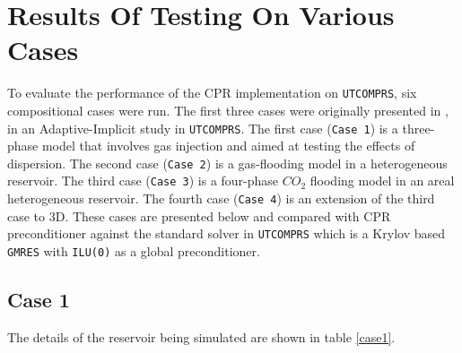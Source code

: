 \chapter{Results Of Testing On Various Cases}
To evaluate the performance of the CPR implementation on \texttt{UTCOMPRS}, six compositional cases were run. 
The first three cases were originally presented in \cite{fernandes}, in an Adaptive-Implicit study in \texttt{UTCOMPRS}. 
The first case (\texttt{Case 1}) is a three-phase model that involves gas injection and aimed 
at testing the effects of dispersion. The second case (\texttt{Case 2}) is a gas-flooding model in 
a heterogeneous reservoir. The third case (\texttt{Case 3}) is a four-phase $CO_{2}$ flooding model 
in an areal heterogeneous reservoir. The fourth case (\texttt{Case 4}) is an extension of the third case to 3D. 
These cases are presented below and compared with CPR preconditioner against
the standard solver in \texttt{UTCOMPRS} which is a Krylov based \texttt{GMRES} with \texttt{ILU(0)} as a global
preconditioner. 

\section{Case 1}
The details of the reservoir being simulated are shown in table \ref{case1}. 

